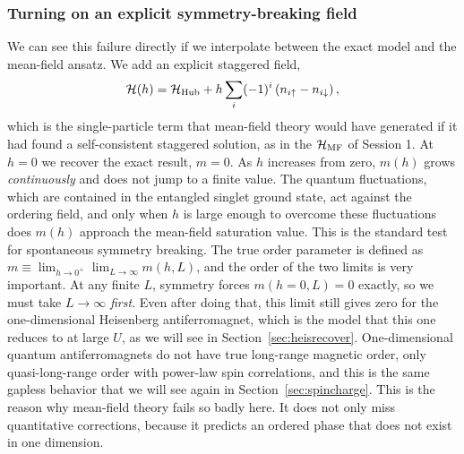\documentclass[lecture_notes.tex]{subfiles}
\begin{document}
\subsubsection{Turning on an explicit symmetry-breaking field}
We can see this failure directly if we interpolate between the exact model and the mean-field
ansatz. We add an explicit staggered field,
\begin{equation}
  \mathcal{H}(h) = \mathcal{H}_{\mathrm{Hub}} + h\sum_i (-1)^i \left(n_{i\uparrow} - n_{i\downarrow}\right),
  \label{eq:stagger}
\end{equation}
which is the single-particle term that mean-field theory would have generated if it had found a
self-consistent staggered solution, as in the $\mathcal{H}_{\mathrm{MF}}$ of Session 1. At $h=0$ we recover the exact
result, $m=0$. As $h$ increases from zero, $m(h)$ grows \emph{continuously} and does not jump to a
finite value. The quantum fluctuations, which are contained in the entangled singlet ground state,
act against the ordering field, and only when $h$ is large enough to overcome these fluctuations
does $m(h)$ approach the mean-field saturation value. This is the standard test for spontaneous
symmetry breaking. The true order parameter is defined as $m \equiv
\lim_{h\to0^+}\lim_{L\to\infty} m(h,L)$, and the order of the two limits is very important. At any
finite $L$, symmetry forces $m(h{=}0,L)=0$ exactly, so we must take $L\to\infty$ \emph{first}.
Even after doing that, this limit still gives zero for the one-dimensional Heisenberg
antiferromagnet, which is the model that this one reduces to at large $U$, as we will see in
Section~\ref{sec:heisrecover}. One-dimensional quantum antiferromagnets do not have true long-range
magnetic order, only quasi-long-range order with power-law spin correlations, and this is the same
gapless behavior that we will see again in Section~\ref{sec:spincharge}. This is the reason why
mean-field theory fails so badly here. It does not only miss quantitative corrections, because it
predicts an ordered phase that does not exist in one dimension.
\end{document}
